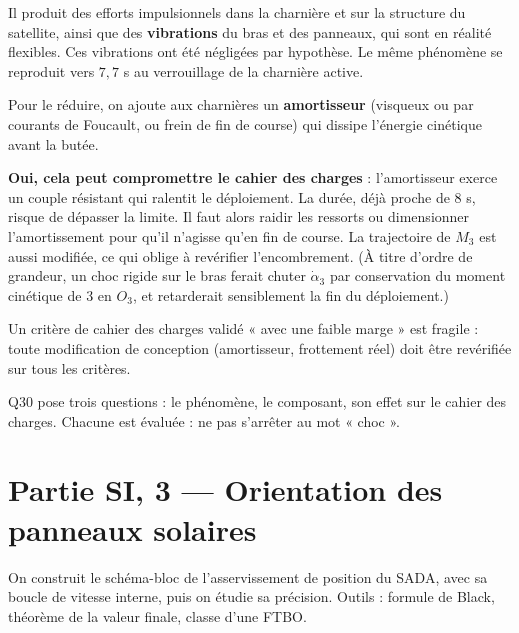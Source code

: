 \documentclass[11pt,a4paper]{article}
\begin{document}
Il produit des efforts impulsionnels dans la charnière et sur la structure du satellite, ainsi que des \textbf{vibrations} du bras et des panneaux, qui sont en réalité flexibles. Ces vibrations ont été négligées par hypothèse. Le même phénomène se reproduit vers \(7{,}7\) s au verrouillage de la charnière active.

Pour le réduire, on ajoute aux charnières un \textbf{amortisseur} (visqueux ou par courants de Foucault, ou frein de fin de course) qui dissipe l'énergie cinétique avant la butée.

\textbf{Oui, cela peut compromettre le cahier des charges} : l'amortisseur exerce un couple résistant qui ralentit le déploiement. La durée, déjà proche de 8 s, risque de dépasser la limite. Il faut alors raidir les ressorts ou dimensionner l'amortissement pour qu'il n'agisse qu'en fin de course. La trajectoire de \(M_3\) est aussi modifiée, ce qui oblige à revérifier l'encombrement. (À titre d'ordre de grandeur, un choc rigide sur le bras ferait chuter \(\dot\alpha_3\) par conservation du moment cinétique de 3 en \(O_3\), et retarderait sensiblement la fin du déploiement.)

\begin{methode}

Un critère de cahier des charges validé « avec une faible marge » est fragile : toute modification de conception (amortisseur, frottement réel) doit être revérifiée sur tous les critères.

\end{methode}

\begin{piege}

Q30 pose trois questions : le phénomène, le composant, son effet sur le cahier des charges. Chacune est évaluée : ne pas s'arrêter au mot « choc ».

\end{piege}

\hypertarget{partie-si-3-orientation-des-panneaux-solaires}{%
\section{Partie SI, 3 --- Orientation des panneaux solaires}\label{partie-si-3-orientation-des-panneaux-solaires}}

On construit le schéma-bloc de l'asservissement de position du SADA, avec sa boucle de vitesse interne, puis on étudie sa précision. Outils : formule de Black, théorème de la valeur finale, classe d'une FTBO.
\end{document}
